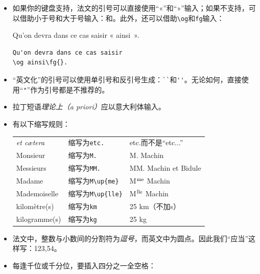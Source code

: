 \begin{itemize}
    \item 如果你的键盘支持，法文的引号可以直接使用“«”和“»”输入；如果不支持，可以借助小于号和大于号输入：\dm{<<}和\dm{>>}。此外，还可以借助\verb|\og|和\verb|fg|输入：
    
\begin{codelist}[7.3]{
    Qu'on devra dans ce cas saisir « ainsi~».
}
\begin{verbatim}
Qu'on devra dans ce cas saisir
\og ainsi\fg{}.\end{verbatim}
\end{codelist}

    \item “英文化”的引号可以使用单引号和反引号生成：\verb|``|和\verb|''|。无论如何，直接使用“\verb|"|”作为引号都是不推荐的。
    
    \item 拉丁短语\emph{理论上（a priori）}应以意大利体输入。
    
    \item 有以下缩写规则：

    \begin{center}
        \begin{tabular}{|l|l|l|}
            \hline
            \emph{et cætera} & 缩写为\quad \verb|etc.| & etc.而不是“etc...” \\
            Monsieur & 缩写为\quad \verb|M.| & M. Machin \\
            Messieurs & 缩写为\quad \verb|MM.| & MM. Machin et Bidule\\
            Madame & 缩写为\quad \verb|M\up{me}| & M$^{\rm me}$ Machin\\
            Mademoiselle & 缩写为\quad \verb|M\up{lle}| & M$^{\rm lle}$ Machin\\
            kilomètre(s) & 缩写为\quad \verb|km| & 25 km（不加s）\\
            kilogramme(s) & 缩写为\quad \verb|kg| & 25 kg\\
            \hline
        \end{tabular}
    \end{center}

    \item 法文中，整数与小数间的分割符为\emph{逗号}，而英文中为圆点。因此我们“应当”这样写：123,54。
    
    \item 每逢千位或千分位，要插入四分之一全空格：
    

\end{itemize}
